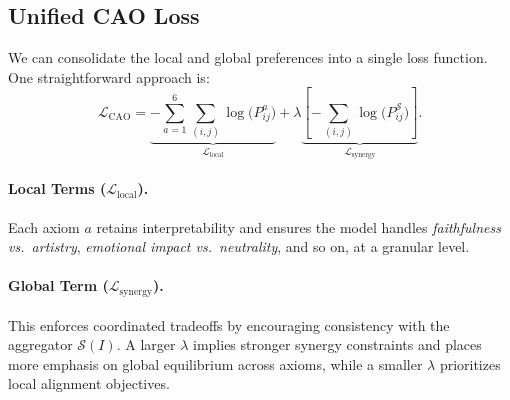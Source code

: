 \subsection{Unified CAO Loss}

We can consolidate the local and global preferences into a single loss function. One straightforward approach is:
\[
\mathcal{L}_{\text{CAO}}
=
\underbrace{
- \sum_{a=1}^{6}
  \sum_{(i,j)}
  \log\!\bigl(P_{ij}^a\bigr)
}_{\mathcal{L}_{\text{local}}}
+
\lambda
\underbrace{
\left[
  - \sum_{(i,j)}
  \log\!\bigl(P_{ij}^{\mathcal{S}}\bigr)
\right]
}_{\mathcal{L}_{\text{synergy}}}.
\]

\paragraph{Local Terms (\(\mathcal{L}_{\text{local}}\)).}  
Each axiom \(a\) retains interpretability and ensures the model handles \emph{faithfulness vs.\ artistry}, \emph{emotional impact vs.\ neutrality}, and so on, at a granular level.

\paragraph{Global Term (\(\mathcal{L}_{\text{synergy}}\)).}  
This enforces coordinated tradeoffs by encouraging consistency with the aggregator \(\mathcal{S}(I)\). A larger \(\lambda\) implies stronger synergy constraints and places more emphasis on global equilibrium across axioms, while a smaller \(\lambda\) prioritizes local alignment objectives.

